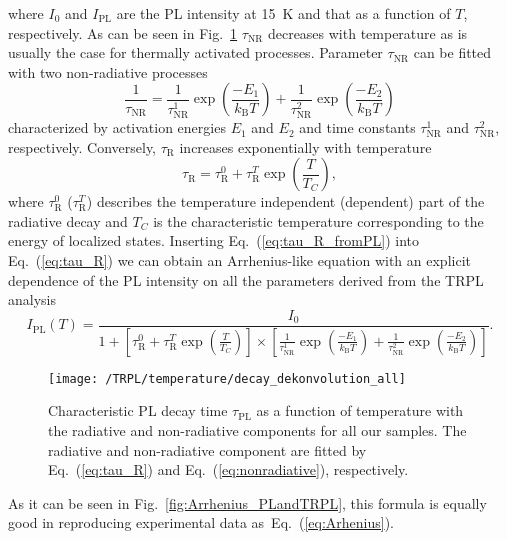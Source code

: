 \noindent where $I_0$ and $I_\mathrm{PL}$ are the PL intensity at 15~K and that as a function of $T$, respectively. As can be seen in Fig.~\ref{fig:TRPL_temp_decon} $\tau_\mathrm{NR}$ decreases with temperature as is usually the case for thermally activated processes. Parameter $\tau_\mathrm{NR}$ can be fitted with two non-radiative processes 
%
\begin{equation}
\frac{1}{\tau_\mathrm{NR}}=\frac{1}{\tau_\mathrm{NR}^1}\exp{\left(\frac{-E_1}{k_\mathrm{B}T}\right)} + \frac{1}{\tau_\mathrm{NR}^2}\exp{\left(\frac{-E_2}{k_\mathrm{B}T}\right)} \label{eq:nonradiative}
\end{equation}
characterized by activation energies $E_1$ and $E_2$ and time constants $\tau_\mathrm{NR}^1$ and $\tau_\mathrm{NR}^2$, respectively.
Conversely, $\tau_\mathrm{R}$ increases exponentially with temperature
%
\begin{equation}
\tau_\mathrm{R} = \tau_\mathrm{R}^0 + \tau_\mathrm{R}^T \exp{\left(\frac{T}{T_C}\right)}, \label{eq:tau_R} 
\end{equation}
where $ \tau_\mathrm{R}^0$ ($ \tau_\mathrm{R}^T$) describes the temperature independent (dependent) part of the radiative decay and $T_C$ is the characteristic temperature corresponding to the energy of localized states. Inserting Eq.~(\ref{eq:tau_R_fromPL}) into Eq.~(\ref{eq:tau_R}) we can obtain an Arrhenius-like equation with an explicit dependence of the PL intensity on all the parameters derived from the TRPL analysis
%
\begin{equation}
I_\mathrm{PL}(T)=\frac{I_0}{1+\left[\tau_\mathrm{R}^0+\tau_\mathrm{R}^T\exp{\left(\frac{T}{T_C}\right)}\right] \times \left[\frac{1}{\tau_\mathrm{NR}^1}\exp{\left(\frac{-E_1}{k_\mathrm{B}T}\right)} + \frac{1}{\tau_\mathrm{NR}^2}\exp{\left(\frac{-E_2}{k_\mathrm{B}T}\right)}\right]}. \label{eq:TRPL_Arhenius}
\end{equation}
%
\begin{figure}
	\centering
	\texttt{[image: /TRPL/temperature/decay\_dekonvolution\_all]}
	\caption{Characteristic PL decay time $\tau_\mathrm{PL}$ as a function of temperature with the radiative and non-radiative components for all our samples. The radiative and non-radiative component are fitted by Eq.~(\ref{eq:tau_R}) and Eq.~(\ref{eq:nonradiative}), respectively.}
	\label{fig:TRPL_temp_decon}
\end{figure}

As it can be seen in Fig.~\ref{fig:Arrhenius_PLandTRPL}, this formula is equally good in reproducing experimental data as~Eq.~(\ref{eq:Arhenius}). 


